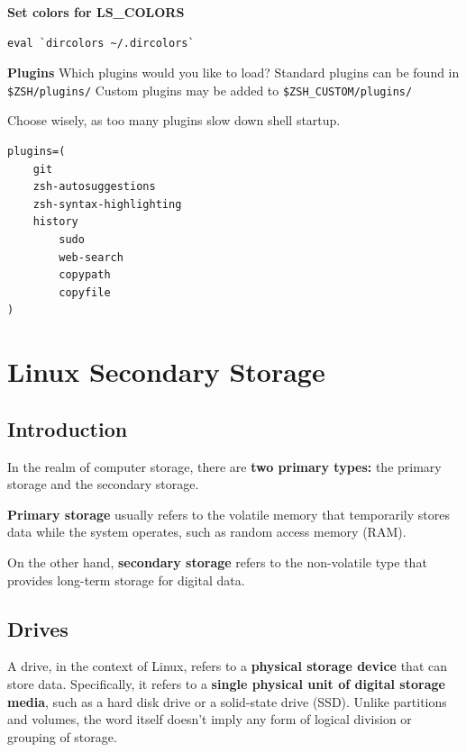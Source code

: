 \documentclass{article}
\newenvironment{blocktemplate}[1]{%
    \tcolorbox[beamer,%
    noparskip,breakable,
    colframe=Blue,%
    colbacklower=LimeGreen!75!LightGreen,%
    title=#1]}%
    {\endtcolorbox}
\newenvironment{codetemplate}[1][]{%
  \mybasecolorbox[#1]
  \itshape
}{%
  \endmybasecolorbox
}
\begin{document}
\textbf{Set colors for LS\_COLORS}
\begin{codetemplate}
\begin{verbatim}
eval `dircolors ~/.dircolors`
\end{verbatim}
\end{codetemplate}

\textbf{Plugins}
Which plugins would you like to load? Standard plugins can be found in \verb|$ZSH/plugins/|
Custom plugins may be added to \verb|$ZSH_CUSTOM/plugins/|

\begin{blocktemplate}{NOTE}
Choose wisely, as too many plugins slow down shell startup.
\end{blocktemplate}

\begin{codetemplate}
\begin{verbatim}
plugins=(
    git
    zsh-autosuggestions
    zsh-syntax-highlighting
    history
        sudo
        web-search
        copypath
        copyfile
)
\end{verbatim}
\end{codetemplate}


\newpage
\section{Linux Secondary Storage}

\subsection{Introduction}

In the realm of computer storage, there are \textbf{two primary types:} the primary storage and the secondary storage.

\textbf{Primary storage} usually refers to the volatile memory that temporarily stores data while the system operates, such as random access memory (RAM).

On the other hand, \textbf{secondary storage} refers to the non-volatile type that provides long-term storage for digital data.

\subsection{Drives}
A drive, in the context of Linux, refers to a \textbf{physical storage device} that can store data. Specifically, it refers to a \textbf{single physical unit of digital storage media}, such as a hard disk drive or a solid-state drive (SSD). Unlike partitions and volumes, the word itself doesn't imply any form of logical division or grouping of storage.
\end{document}
